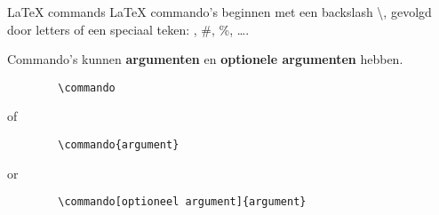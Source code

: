 \copyrightTim

\begin{frame}[fragile]{LaTeX commands}
    LaTeX commando's beginnen met een backslash \textbackslash, gevolgd door letters of een speciaal teken: \@, \#, \%, \ldots.

    Commando's kunnen \textbf{argumenten} en \textbf{optionele argumenten} hebben.

    \begin{verbatim}
        \commando
    \end{verbatim}
    of
    \begin{verbatim}
        \commando{argument}
    \end{verbatim}
    or
    \begin{verbatim}
        \commando[optioneel argument]{argument}
    \end{verbatim}

\end{frame}